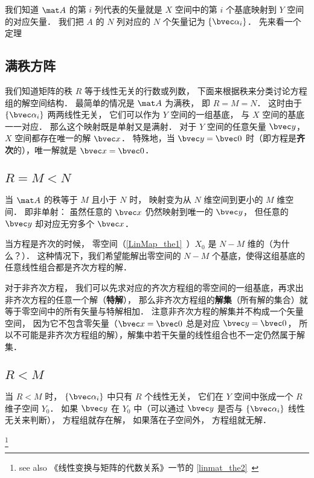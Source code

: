 我们知道 $\mat A$ 的第 $i$ 列代表的矢量就是 $X$ 空间中的第 $i$ 个基底映射到 $Y$ 空间的对应矢量． 我们把 $A$ 的 $N$ 列对应的 $N$ 个矢量记为 $\{\bvec \alpha_i\}$． 先来看一个定理

\subsection{满秩方阵}
我们知道矩阵的秩 $R$ 等于线性无关的行数或列数， 下面来根据秩来分类讨论方程组的解空间结构． 最简单的情况是 $\mat A$ 为满秩， 即 $R = M = N$． 这时由于 $\{\bvec \alpha_i\}$ 两两线性无关， 它们可以作为 $Y$ 空间的一组基底， 与 $X$ 空间的基底一一对应． 那么这个映射既是单射又是满射．%
对于 $Y$ 空间的任意矢量 $\bvec y$， $X$ 空间都存在唯一的解 $\bvec x$． 特殊地，当 $\bvec y = \bvec 0$ 时（即方程是\textbf{齐次}的），唯一解就是 $\bvec x = \bvec 0$．

\subsection{$R = M < N$}\label{LinEq_sub1}

当 $\mat A$ 的秩等于 $M$ 且小于 $N$ 时， 映射变为从 $N$ 维空间到更小的 $M$ 维空间． 即非单射： 虽然任意的 $\bvec x$ 仍然映射到唯一的 $\bvec y$， 但任意的 $\bvec y$ 却对应无穷多个 $\bvec x$． 


当方程是齐次的时候， 零空间（\autoref{LinMap_the1}~）$X_0$ 是 $N- M$ 维的（为什么？）． 这种情况下，我们希望能解出零空间的 $N - M$ 个基底，使得这组基底的任意线性组合都是齐次方程的解．

对于非齐次方程， 我们可以先求对应的齐次方程组的零空间的一组基底，再求出非齐次方程的任意一个解（\textbf{特解}）， 那么非齐次方程组的\textbf{解集}（所有解的集合）就等于零空间中的所有矢量与特解相加． 注意非齐次方程的解集并不构成一个矢量空间， 因为它不包含零矢量（$\bvec x = \bvec 0$ 总是对应 $\bvec y = \bvec 0$， 所以不可能是非齐次方程组的解），解集中若干矢量的线性组合也不一定仍然属于解集．

\subsection{$R < M$}
当 $R < M$ 时， $\{\bvec \alpha_i\}$ 中只有 $R$ 个线性无关， 它们在 $Y$ 空间中张成一个 $R$ 维子空间 $Y_0$． 如果 $\bvec y$ 在 $Y_0$ 中（可以通过 $\bvec y$ 是否与 $\{\bvec \alpha_i\}$ 线性无关来判断）， 方程组就存在解， 如果落在子空间外， 方程组就无解．

\footnote{see also 《线性变换与矩阵的代数关系》一节的 \autoref{linmat_the2}~}

